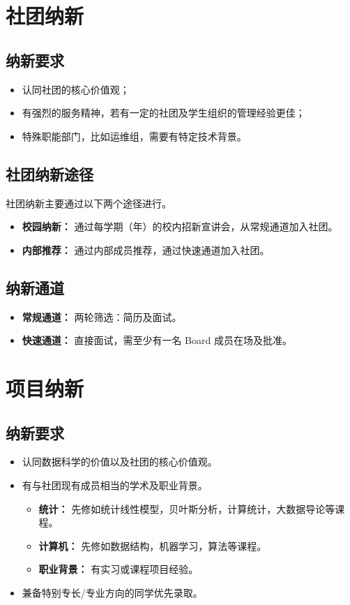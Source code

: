 \section{社团纳新}
    \subsection{纳新要求}
    \begin{itemize}
        \item 认同社团的核心价值观；
        \item 有强烈的服务精神，若有一定的社团及学生组织的管理经验更佳；
        \item 特殊职能部门，比如运维组，需要有特定技术背景。
    \end{itemize}


    \subsection{社团纳新途径}
    社团纳新主要通过以下两个途径进行。
    \begin{itemize}
        \item \textbf{校园纳新：} 通过每学期（年）的校内招新宣讲会，从常规通道加入社团。
        \item \textbf{内部推荐：} 通过内部成员推荐，通过快速通道加入社团。
    \end{itemize}


    \subsection{纳新通道}
    \begin{itemize}
        \item \textbf{常规通道：} 两轮筛选：简历及面试。
        \item \textbf{快速通道：} 直接面试，需至少有一名 Board 成员在场及批准。
    \end{itemize}



\section{项目纳新}
    \subsection{纳新要求}
    \begin{itemize}
        \item 认同数据科学的价值以及社团的核心价值观。
        \item 有与社团现有成员相当的学术及职业背景。
            \begin{itemize}
                \item \textbf{统计：} 先修如统计线性模型，贝叶斯分析，计算统计，大数据导论等课程。
                \item \textbf{计算机：} 先修如数据结构，机器学习，算法等课程。
                \item \textbf{职业背景：} 有实习或课程项目经验。
            \end{itemize}
        \item 兼备特别专长/专业方向的同学优先录取。
    \end{itemize}


